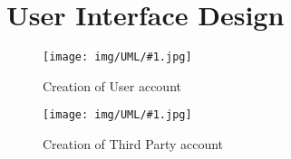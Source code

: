 \documentclass[../DD0.tex]{subfiles}
\begin{document}
\newcommand{\fetchUML}[4] {
  \begin{figure}[h!]
    \centering
    \hspace*{-#4cm}
    \texttt{[image: img/UML/\#1.jpg]}
    \caption{#2}
    \label{fig:#1}
  \end{figure}
}

\section {User Interface Design}
\label{sec:userdes}

    \fetchUML
      {User_Registration}
      {Creation of User account}
      {1}           %
      {0}           %

  \clearpage
\label{sec:userdes}

    \fetchUML
      {Third_Party_Registration}
      {Creation of Third Party account}
      {1}           %
      {0}           %

  \clearpage
\end{document}
